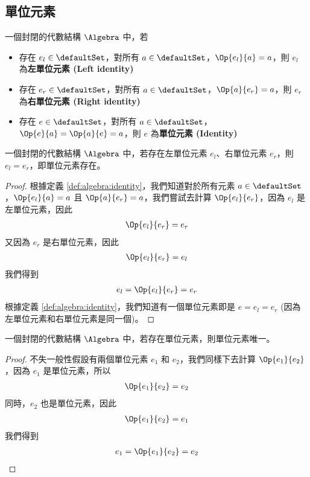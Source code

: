 \documentclass[12pt,a4paper,oneside]{report}
\begin{document}
\begin{CJK}{UTF8}{bkai}
\subsection{單位元素}

\begin{mydef}[單位元素]
\label{def:algebra:identity}
一個封閉的代數結構 $\Algebra$ 中，若
\begin{itemize}
\item 存在 $e_l\in{\defaultSet}$，對所有 $a\in{\defaultSet}$，$\Op{e_l}{a}=a$，則 $e_l$ 為\textbf{左單位元素 (Left identity)}
\item 存在 $e_r\in{\defaultSet}$，對所有 $a\in{\defaultSet}$，$\Op{a}{e_r}=a$，則 $e_r$ 為\textbf{右單位元素 (Right identity)}
\item 存在 $e\in{\defaultSet}$，對所有 $a\in{\defaultSet}$，$\Op{e}{a}=\Op{a}{e}=a$，則 $e$ 為\textbf{單位元素 (Identity)}
\end{itemize}
\end{mydef}

\begin{mythm}[單位元素存在性]
\label{thm:algebra:identity_existence}
一個封閉的代數結構 $\Algebra$ 中，若存在左單位元素 $e_l$、右單位元素 $e_r$，則 $e_l=e_r$，即單位元素存在。
\end{mythm}
\begin{proof}
根據定義 \ref{def:algebra:identity}，我們知道對於所有元素 $a\in{\defaultSet}$，$\Op{e_l}{a}=a$ 且 $\Op{a}{e_r}=a$，我們嘗試去計算 $\Op{e_l}{e_r}$，因為 $e_l$ 是左單位元素，因此
\begin{align*}
\Op{e_l}{e_r}=e_r
\end{align*}
又因為 $e_r$ 是右單位元素，因此
\begin{align*}
\Op{e_l}{e_r}=e_l
\end{align*}
我們得到
\begin{align*}
e_l=\Op{e_l}{e_r}=e_r
\end{align*}
根據定義 \ref{def:algebra:identity}，我們知道有一個單位元素即是 $e=e_l=e_r$ (因為左單位元素和右單位元素是同一個)。
\end{proof}

\begin{mythm}[單位元素唯一性]
\label{thm:algebra:identity_uniqueness}
一個封閉的代數結構 $\Algebra$ 中，若存在單位元素，則單位元素唯一。
\end{mythm}
\begin{proof}
不失一般性假設有兩個單位元素 $e_1$ 和 $e_2$，我們同樣下去計算 $\Op{e_1}{e_2}$，因為 $e_1$ 是單位元素，所以
\begin{align*}
\Op{e_1}{e_2}=e_2
\end{align*}
同時，$e_2$ 也是單位元素，因此
\begin{align*}
\Op{e_1}{e_2}=e_1
\end{align*}
我們得到
\begin{align*}
e_1=\Op{e_1}{e_2}=e_2
\end{align*}
\end{proof}


\end{CJK}
\end{document}
